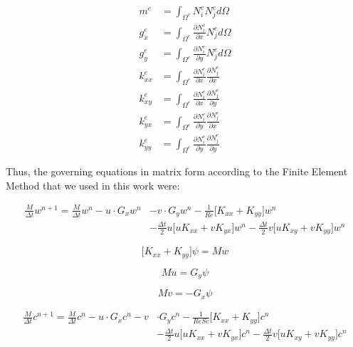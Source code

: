 \begin{equation}
 \begin{aligned}
  m^{e} & = \int_{\Omega^{e}} N_{i}^{e} N_{j}^{e} d\Omega \\
  g_{x}^{e} & = \int_{\Omega^{e}} \frac{\partial N_{i}^{e}}{\partial x} N_{j}^{e} d\Omega \\
  g_{y}^{e} & = \int_{\Omega^{e}} \frac{\partial N_{i}^{e}}{\partial y} N_{j}^{e} d\Omega \\
  k_{xx}^{e} & = \int_{\Omega^{e}} \frac{\partial N_{i}^{e}}{\partial x} \frac{\partial N_{j}^{e}}{\partial x} \\
  k_{xy}^{e} & = \int_{\Omega^{e}} \frac{\partial N_{i}^{e}}{\partial x} \frac{\partial N_{j}^{e}}{\partial y} \\
  k_{yx}^{e} & = \int_{\Omega^{e}} \frac{\partial N_{i}^{e}}{\partial y} \frac{\partial N_{j}^{e}}{\partial x} \\
  k_{yy}^{e} & = \int_{\Omega^{e}} \frac{\partial N_{i}^{e}}{\partial y} \frac{\partial N_{j}^{e}}{\partial y}
 \end{aligned}
\end{equation}

\medskip
Thus, the governing equations in matrix form according to 
the Finite Element Method that we used in this work were:

\begin{equation} \label{final equation}
\begin{aligned}
 \frac{M}{\Delta t} w^{n+1} = \frac{M}{\Delta t} w^{n} - u \cdot G_x w^{n} & - v \cdot G_y w^{n} 
 - \frac{1}{\textit{Re}} \Big[ K_{xx} + K_{yy} \Big] w^{n}  
 \\[5pt]
 & - \frac{\Delta t}{2} u \Big[ u K_{xx} + v K_{yx} \Big] w^{n} 
 - \frac{\Delta t}{2} v \Big[ u K_{xy} + v K_{yy} \Big] w^{n} 
\end{aligned}
\end{equation}


\begin{equation}
 \Big[ K_{xx} + K_{yy} \Big] \psi = Mw
\end{equation}

\begin{equation}
 Mu = G_y \psi
\end{equation}

\begin{equation}
 Mv = - G_x \psi
\end{equation}

\begin{equation}
\begin{aligned}
 \frac{M}{\Delta t} c^{n+1} = \frac{M}{\Delta t} c^{n}  - u \cdot G_x c^{n} - v & \cdot G_y c^{n} 
 - \frac{1}{\textit{ReSc}} \Big[ K_{xx} + K_{yy} \Big] c^{n}  
 \\[5pt]
 & - \frac{\Delta t}{2} u \Big[ u K_{xx} + v K_{yx} \Big] c^{n} 
 - \frac{\Delta t}{2} v \Big[ u K_{xy} + v K_{yy} \Big] c^{n} 
\end{aligned}
\end{equation}
